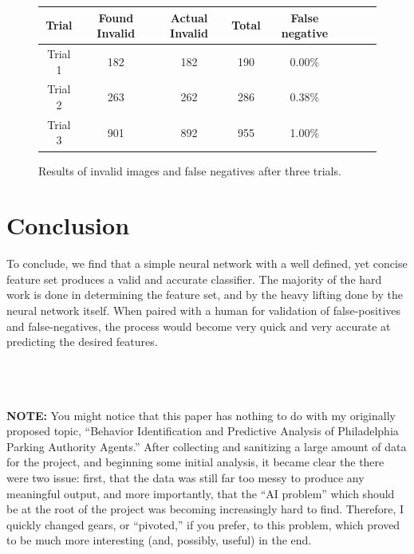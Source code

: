 \documentclass[conference]{IEEEtran}
\begin{document}
    \begin{figure}
    \centering
    {\footnotesize
    \begin{tabular}{|c|c|c|c|c|c|c|c|}
        \hline
        \textbf{Trial} &  \textbf{Found Invalid} & \textbf{Actual Invalid} &
        \textbf{Total} & \textbf{False negative} \\\hline
        Trial 1 & 182 & 182 & 190 & 0.00\% \\\hline
        Trial 2 & 263 & 262 & 286 & 0.38\% \\\hline
        Trial 3 & 901 & 892 & 955 & 1.00\% \\\hline
    \end{tabular}
    }
    \caption{Results of invalid images and false negatives after three trials.}
    \end{figure}

\section{Conclusion}
To conclude, we find that a simple neural network with a well defined, yet
concise feature set produces a valid and accurate classifier. The majority of
the hard work is done in determining the feature set, and by the heavy lifting
done by the neural network itself. When paired with a human for validation of
false-positives and false-negatives, the process would become very quick and
very accurate at predicting the desired features.



~\\
~\\
~\\
{ \footnotesize
\textbf{NOTE:} You might notice that this paper has nothing to do with my
originally proposed topic, ``Behavior Identification and Predictive Analysis of
Philadelphia Parking Authority Agents.'' After collecting and sanitizing a large
amount of data for the project, and beginning some initial analysis, it became
clear the there were two issue: first, that the data was still far too messy to
produce any meaningful output, and more importantly, that the ``AI problem''
which should be at the root of the project was becoming increasingly hard to
find. Therefore, I quickly changed gears, or ``pivoted,'' if you prefer, to this
problem, which proved to be much more interesting (and, possibly, useful) in the
end.
}
\end{document}
